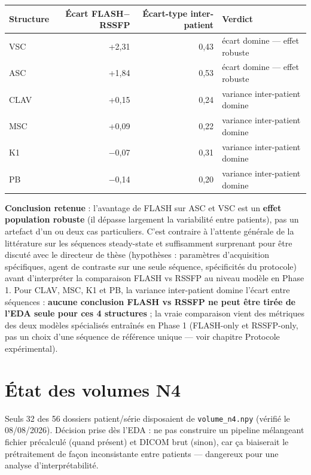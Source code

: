\begin{center}
\begin{tabular}{lrrl}
\toprule
Structure & Écart FLASH$-$RSSFP & Écart-type inter-patient & Verdict \\
\midrule
VSC  & +2,31 & 0,43 & écart domine --- effet robuste \\
ASC  & +1,84 & 0,53 & écart domine --- effet robuste \\
CLAV & +0,15 & 0,24 & variance inter-patient domine \\
MSC  & +0,09 & 0,22 & variance inter-patient domine \\
K1   & $-$0,07 & 0,31 & variance inter-patient domine \\
PB   & $-$0,14 & 0,20 & variance inter-patient domine \\
\bottomrule
\end{tabular}
\end{center}

\textbf{Conclusion retenue} : l'avantage de FLASH sur ASC et VSC est un \textbf{effet population
robuste} (il dépasse largement la variabilité entre patients), pas un artefact d'un ou deux cas
particuliers. C'est contraire à l'attente générale de la littérature sur les séquences steady-state et
suffisamment surprenant pour être discuté avec le directeur de thèse (hypothèses : paramètres
d'acquisition spécifiques, agent de contraste sur une seule séquence, spécificités du protocole) avant
d'interpréter la comparaison FLASH vs RSSFP au niveau modèle en Phase 1. Pour CLAV, MSC, K1 et PB, la
variance inter-patient domine l'écart entre séquences : \textbf{aucune conclusion FLASH vs RSSFP ne
peut être tirée de l'EDA seule pour ces 4 structures} ; la vraie comparaison vient des métriques des
deux modèles spécialisés entraînés en Phase 1 (FLASH-only et RSSFP-only, pas un choix d'une séquence
de référence unique --- voir chapitre Protocole expérimental).

\section{État des volumes N4}
\label{sec:n4-manquant}

Seuls 32 des 56 dossiers patient/série disposaient de \texttt{volume\_n4.npy} (vérifié le 08/08/2026).
Décision prise dès l'EDA : ne pas construire un pipeline mélangeant fichier précalculé (quand présent)
et DICOM brut (sinon), car ça biaiserait le prétraitement de façon inconsistante entre patients ---
dangereux pour une analyse d'interprétabilité.

